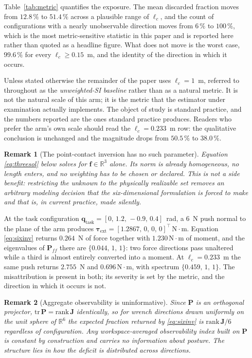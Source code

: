\documentclass{ieeeaccess}
\newtheorem{remark}{Remark}
\newcommand{\R}{\mathbb{R}}
\newcommand{\Jfull}{\bm{J}}
\newcommand{\Pobs}{\bm{P}}
\newcommand{\Pff}{\bm{P}_{\!f\!f}}
\newcommand{\lc}{\ell_c}
\newcommand{\tauext}{\bm{\tau}_{\mathrm{ext}}}
\begin{document}
Table~\ref{tab:metric} quantifies the exposure. The mean discarded fraction moves
from $12.8\,\%$ to $51.4\,\%$ across a plausible range of $\lc$, and the count of
configurations with a nearly unobservable direction moves from $6\,\%$ to
$100\,\%$,
which is the most metric-sensitive statistic in this paper and is reported
here rather than quoted as a headline figure. What does not move is the worst case, $99.6\,\%$ for
every $\lc\ge0.15$~m, and the identity of the direction in which it occurs.

Unless stated otherwise the remainder of the paper uses $\lc=1$~m, referred to
throughout as the \emph{unweighted-SI baseline} rather than as a natural metric.
It is not the natural scale of this arm; it is the metric that the estimator under
examination actually implements. The object of study is
standard practice, and the numbers reported are the ones standard practice
produces. Readers who prefer the arm's own scale should read the
$\lc=0.233$~m row: the qualitative conclusion is unchanged and the magnitude drops
from $50.5\,\%$ to $38.0\,\%$.

\begin{remark}[The point-contact inversion has no such parameter]
Equation \eqref{eq:threesol} below solves for $\bm f\in\R^3$ alone. Its norm is
already homogeneous, no length enters, and no weighting has to be chosen or
declared. This is not a side benefit: restricting the unknown to the physically
realizable set removes an arbitrary modeling decision that the six-dimensional
formulation is forced to make and that is, in current practice, made silently.
\label{rem:nometric}
\end{remark}

At the task configuration $\bm q_{\text{task}}=[0,\,1.2,\,-0.9,\,0.4]$~rad, a
$6$~N push normal to the plane of the arm produces
$\tauext=[1.2867,\,0,\,0,\,0]^{\!\top}\,\mathrm{N}\cdot\mathrm{m}$. Equation
\eqref{eq:sixinv} returns $0.264$~N of force together with
$1.230\,\mathrm{N}\cdot\mathrm{m}$ of moment, and the eigenvalues of $\Pff$ there
are $\{0.044,\,1,\,1\}$: two force directions pass unaltered while a third is
almost entirely converted into a moment. At $\lc=0.233$~m the same push returns
$2.755$~N and $0.696\,\mathrm{N}\cdot\mathrm{m}$, with spectrum
$\{0.459,\,1,\,1\}$. The misattribution is present in both; its severity is set by
the metric, and the direction in which it occurs is not.

\begin{remark}[Aggregate observability is uninformative]
Since $\Pobs$ is an orthogonal projector, $\mathrm{tr}\,\Pobs=\mathrm{rank}\,
\Jfull$ identically, so for wrench directions drawn uniformly on the unit sphere
of $\R^6$ the expected fraction returned by \eqref{eq:sixinv} is
$\mathrm{rank}\,\Jfull/6$ regardless of configuration. Any workspace-averaged
observability index built on $\Pobs$ is constant by construction and carries no
information about posture. The structure lies in how the deficit is distributed
across directions.
\label{rem:trace}
\end{remark}
\end{document}
